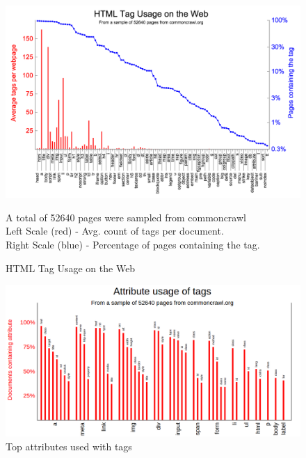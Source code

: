 \documentclass[conference]{IEEEtran}
\begin{document}
\begin{figure}
\centering
\includegraphics[width=7in]{taggraph3.png}
\caption{HTML Tag Usage on the Web}
\small
\begin{flushleft}
A total of 52640 pages were sampled from commoncrawl \cite{commoncrawl}\\
Left Scale (red) - Avg. count of tags per document.\\
Right Scale (blue) - Percentage of pages containing the tag.
\end{flushleft}
\label{Tagsgraph}
\end{figure}

\begin{figure}
\centering
\includegraphics[width=6.5in]{attrgraph.png}
\caption{Top attributes used with tags}
\label{attrgraph}
\end{figure}
\end{document}
